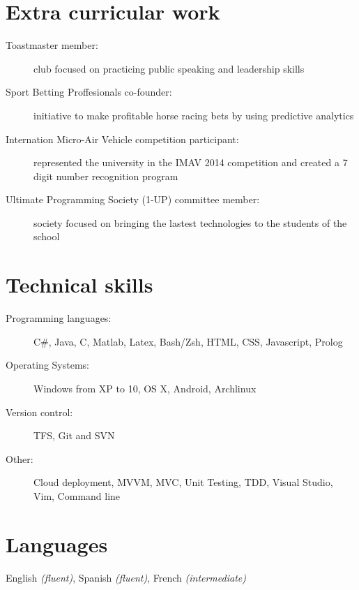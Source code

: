 \documentclass{CurriculumVitae}
\begin{document}
  
  \section{Extra curricular work}
  \begin{description}
    \item[Toastmaster member:] club focused on practicing public speaking and leadership skills
    \item[Sport Betting Proffesionals co-founder:] initiative to make profitable horse racing bets by using predictive analytics
    \item[Internation Micro-Air Vehicle competition participant:] represented the university in the IMAV 2014 competition and created a 7 digit number recognition program
    \item[Ultimate Programming Society (1-UP) committee member:] society focused on bringing the lastest technologies to the students of the school
  \end{description}

  \section{Technical skills}
  \begin{description}
    \item[Programming languages:] C\#, Java, C, Matlab, Latex, Bash/Zsh, HTML, CSS, Javascript, Prolog
    \item[Operating Systems:] Windows from XP to 10, OS X, Android, Archlinux
    \item[Version control:] TFS, Git and SVN
    \item[Other:] Cloud deployment, MVVM, MVC, Unit Testing, TDD, Visual Studio, Vim, Command line%
  \end{description}

  \section{Languages}
    English \emph{(fluent)}, Spanish \emph{(fluent)}, French \emph{(intermediate)}%
	
\end{document}
